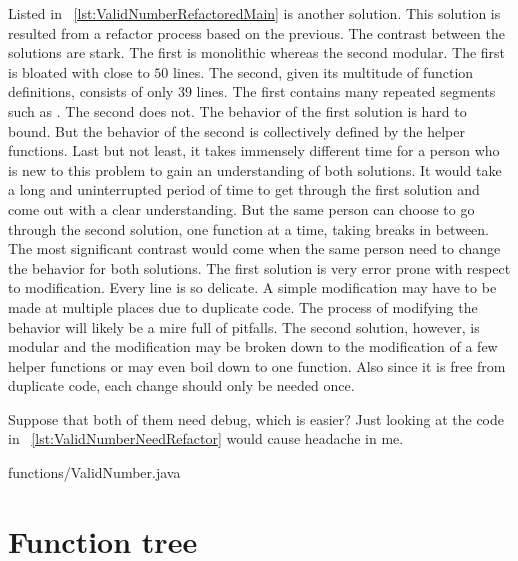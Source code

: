 Listed in ~\autoref{lst:ValidNumberRefactoredMain} is another solution.
This solution is resulted from a refactor process based on the previous.
The contrast between the solutions are stark.
The first is monolithic whereas the second modular.
The first is bloated with close to $50$ lines.
The second, given its multitude of function definitions, consists of only $39$ lines.
The first contains many repeated segments such as .
The second does not.
The behavior of the first solution is hard to bound.
But the behavior of the second is collectively defined by the helper functions.
Last but not least, it takes immensely different time for a person who is new to this problem to
gain an understanding of both solutions.
It would take a long and uninterrupted period of time to get through the first solution and come
out with a clear understanding.
But the same person can choose to go through the second solution, one function at a time, taking
breaks in between.
The most significant contrast would come when the same person need to change the behavior for both
solutions.
The first solution is very error prone with respect to modification.
Every line is so delicate.
A simple modification may have to be made at multiple places due to duplicate code.
The process of modifying the behavior will likely be a mire full of pitfalls.
The second solution, however, is modular and the modification may be broken down to the
modification of a few helper functions or may even boil down to one function.
Also since it is free from duplicate code, each change should only be needed once.


Suppose that both of them need debug, which is easier?
Just looking at the code in ~\autoref{lst:ValidNumberNeedRefactor} would cause headache in me.






{functions/ValidNumber.java}


\section{Function tree}\label{sec:functionFamilies}


